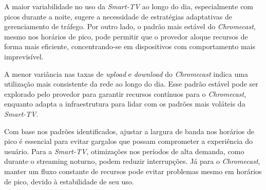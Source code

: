 A maior variabilidade no uso da \textit{Smart-TV} ao longo do dia, especialmente com picos durante a noite, sugere a necessidade de estratégias adaptativas de gerenciamento de tráfego. Por outro lado, o padrão mais estável do \textit{Chromecast}, mesmo nos horários de pico, pode permitir que o provedor aloque recursos de forma mais eficiente, concentrando-se em dispositivos com comportamento mais imprevisível.

A menor variância nas taxas de \textit{upload} e \textit{download} do \textit{Chromecast} indica uma utilização mais consistente da rede ao longo do dia. Esse padrão estável pode ser explorado pelo provedor para garantir recursos contínuos para o \textit{Chromecast}, enquanto adapta a infraestrutura para lidar com os padrões mais voláteis da \textit{Smart-TV}.

Com base nos padrões identificados, ajustar a largura de banda nos horários de pico é essencial para evitar gargalos que possam comprometer a experiência do usuário. Para a \textit{Smart-TV}, otimizações nos períodos de alta demanda, como durante o streaming noturno, podem reduzir interrupções. Já para o \textit{Chromecast}, manter um fluxo constante de recursos pode evitar problemas mesmo em horários de pico, devido à estabilidade de seu uso.




